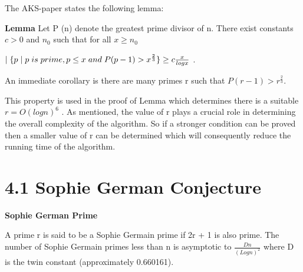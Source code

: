 \documentclass[a4paper,12pt]{article}
\begin{document}
\begin{flushleft}
	The AKS-paper states the following lemma:
\end{flushleft}

\begin{flushleft}
	\textbf{Lemma}  Let P (n) denote the greatest prime divisor of n. There exist constants \(c > 0\) and \(n_{0}\) such that for all \(x \geq n_{0}\)
\end{flushleft}

\begin{center}
	\(|\hspace{0.1cm} \{p\hspace{0.1cm} |\hspace{0.1cm} p\hspace{0.1cm} is\hspace{0.1cm} prime, p \leq x \hspace{0.1cm} and \hspace{0.1cm} P(p - 1) > x^\frac{2}{3} \}  \geq c \frac{x}{logx}\) .
\end{center}

\begin{flushleft}
	An immediate corollary is there are many primes r such that \(P(r-1)>r^\frac{2}{3}\).
\end{flushleft}
This property is used in the proof of Lemma which determines there is a suitable \(r = O(log n)^{6}\) . As mentioned, the value of r plays a crucial role in determining the overall complexity of the algorithm. So if a stronger condition can be proved then a smaller value of r can be determined which will consequently reduce the running time of the algorithm.

\section*{\large 4.1 Sophie German Conjecture}

\begin{flushleft}
	\textbf{Sophie German Prime}
\end{flushleft}
\begin{flushleft}
A prime r is said to be a Sophie Germain prime if 2r + 1 is also prime. 
\vspace{0.1in}
\newline
The number of Sophie Germain primes less than n is asymptotic to \(\frac{Dn}{(Logn)^2}\) where D is the twin constant (approximately 0.660161).
\end{flushleft}
\end{document}
